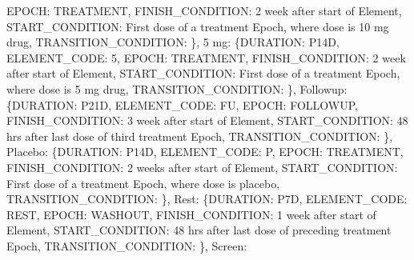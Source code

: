 \documentclass[letterpaper,10pt,english]{sphinxmanual}
\begin{document}
\begin{fulllineitems}
\begin{fulllineitems}
\textquotesingle{}EPOCH\textquotesingle{}: \textquotesingle{}TREATMENT\textquotesingle{}, \textquotesingle{}FINISH\_CONDITION\textquotesingle{}: \textquotesingle{}2 week after start of Element\textquotesingle{}, \textquotesingle{}START\_CONDITION\textquotesingle{}: \textquotesingle{}First dose of a treatment Epoch, where dose is 10 mg drug\textquotesingle{}, \textquotesingle{}TRANSITION\_CONDITION\textquotesingle{}: \textquotesingle{}\textquotesingle{}\}, \textquotesingle{}5 mg\textquotesingle{}: \{\textquotesingle{}DURATION\textquotesingle{}: \textquotesingle{}P14D\textquotesingle{}, \textquotesingle{}ELEMENT\_CODE\textquotesingle{}: \textquotesingle{}5\textquotesingle{}, \textquotesingle{}EPOCH\textquotesingle{}: \textquotesingle{}TREATMENT\textquotesingle{}, \textquotesingle{}FINISH\_CONDITION\textquotesingle{}: \textquotesingle{}2 week after start of Element\textquotesingle{}, \textquotesingle{}START\_CONDITION\textquotesingle{}: \textquotesingle{}First dose of a treatment Epoch, where dose is 5 mg drug\textquotesingle{}, \textquotesingle{}TRANSITION\_CONDITION\textquotesingle{}: \textquotesingle{}\textquotesingle{}\}, \textquotesingle{}Follow\sphinxhyphen{}up\textquotesingle{}: \{\textquotesingle{}DURATION\textquotesingle{}: \textquotesingle{}P21D\textquotesingle{}, \textquotesingle{}ELEMENT\_CODE\textquotesingle{}: \textquotesingle{}FU\textquotesingle{}, \textquotesingle{}EPOCH\textquotesingle{}: \textquotesingle{}FOLLOW\sphinxhyphen{}UP\textquotesingle{}, \textquotesingle{}FINISH\_CONDITION\textquotesingle{}: \textquotesingle{}3 week after start of Element\textquotesingle{}, \textquotesingle{}START\_CONDITION\textquotesingle{}: \textquotesingle{}48 hrs after last dose of third treatment Epoch\textquotesingle{}, \textquotesingle{}TRANSITION\_CONDITION\textquotesingle{}: \textquotesingle{}\textquotesingle{}\}, \textquotesingle{}Placebo\textquotesingle{}: \{\textquotesingle{}DURATION\textquotesingle{}: \textquotesingle{}P14D\textquotesingle{}, \textquotesingle{}ELEMENT\_CODE\textquotesingle{}: \textquotesingle{}P\textquotesingle{}, \textquotesingle{}EPOCH\textquotesingle{}: \textquotesingle{}TREATMENT\textquotesingle{}, \textquotesingle{}FINISH\_CONDITION\textquotesingle{}: \textquotesingle{}2 weeks after start of Element\textquotesingle{}, \textquotesingle{}START\_CONDITION\textquotesingle{}: \textquotesingle{}First dose of a treatment Epoch, where dose is placebo\textquotesingle{}, \textquotesingle{}TRANSITION\_CONDITION\textquotesingle{}: \textquotesingle{}\textquotesingle{}\}, \textquotesingle{}Rest\textquotesingle{}: \{\textquotesingle{}DURATION\textquotesingle{}: \textquotesingle{}P7D\textquotesingle{}, \textquotesingle{}ELEMENT\_CODE\textquotesingle{}: \textquotesingle{}REST\textquotesingle{}, \textquotesingle{}EPOCH\textquotesingle{}: \textquotesingle{}WASHOUT\textquotesingle{}, \textquotesingle{}FINISH\_CONDITION\textquotesingle{}: \textquotesingle{}1 week after start of Element\textquotesingle{}, \textquotesingle{}START\_CONDITION\textquotesingle{}: \textquotesingle{}48 hrs after last dose of preceding treatment Epoch\textquotesingle{}, \textquotesingle{}TRANSITION\_CONDITION\textquotesingle{}: \textquotesingle{}\textquotesingle{}\}, \textquotesingle{}Screen\textquotesingle{}: 
\end{fulllineitems}
\end{fulllineitems}
\end{document}
